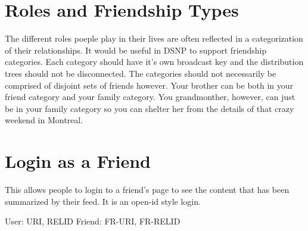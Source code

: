 \documentclass[letterpaper,11pt,oneside]{article}
\begin{document}
\section{Roles and Friendship Types}

The different roles poeple play in their lives are often reflected in a
categorization of their relationships. It would be useful in DSNP to support
friendship categories. Each category should have it's own broadcast key and the
distribution trees should not be disconnected. The categories should not
necessarily be comprised of disjoint sets of friends however. Your brother can
be both in your friend category and your family category. You grandmonther,
however, can just be in your family category so you can shelter her from the
details of that crazy weekend in Montreal.

\section{Login as a Friend}

This allows people to login to a friend's page to see the content that has been
summarized by their feed. It is an open-id style login.

User:     URI,    RELID
Friend:   FR-URI, FR-RELID
\end{document}
